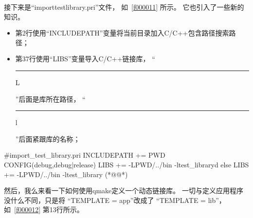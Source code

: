 接下来是“import\underline{\hspace{0.5em}}test\underline{\hspace{0.5em}}library.pri”文件，
如\filesourcenumbernameone\ \ref{f000011} 所示。
它也引入了一些新的知识。
\begin{itemize}
\item 第2行使用“INCLUDEPATH”变量将当前目录加入C/C{\sourcefonttwo{}+}{\sourcefonttwo{}+}包含路径搜索路径；
\item 第3\raisebox{0.16ex}{\sourcefonttwo\~{}}7行使用“LIBS”变量导入C/C{\sourcefonttwo{}+}{\sourcefonttwo{}+}链接库，
“{\hspace{0.05em}\rule[0.7ex]{0.4em}{0.65pt}\hspace{0.05em}L}”后面是库所在路径，
“{\hspace{0.05em}\rule[0.7ex]{0.4em}{0.65pt}\hspace{0.05em}l}”后面紧跟库的名称；
\end{itemize}
\label{f000011}    %
\FloatBarrier                                  %
\begin{thebookfilesourceone}[escapeinside={(*@}{@*)},
caption=GoodLuck,
title=\filesourcenumbernameone \thefilesourcenumber
]
#import_test_library.pri
INCLUDEPATH += $$PWD
CONFIG(debug,debug|release){
    LIBS += -L$$PWD/../bin -ltest_libraryd
}else{
    LIBS += -L$$PWD/../bin -ltest_library
}(*@\marginpar[\hfill\setlength\fboxsep{2pt}\fbox{\footnotesize{\kaishu\parbox{1em}{\setlength{\baselineskip}{2pt}\filesourcenumbernameone}}\footnotesize{\thefilesourcenumber}}]{\setlength\fboxsep{2pt}\fbox{\footnotesize{\kaishu\parbox{1em}{\setlength{\baselineskip}{2pt}\filesourcenumbernameone}}\footnotesize{\thefilesourcenumber}}}@*)\end{thebookfilesourceone}          %
\addtocounter{lstlisting}{-1}   %


然后，我么来看一下如何使用qmake定义一个动态链接库。
一切与定义应用程序没什么不同，只是将
“TEMPLATE {\sourcefonttwo{}=} app”改成了
“TEMPLATE {\sourcefonttwo{}=} lib”，如\filesourcenumbernameone\ \ref{f000012} 第13行所示。

